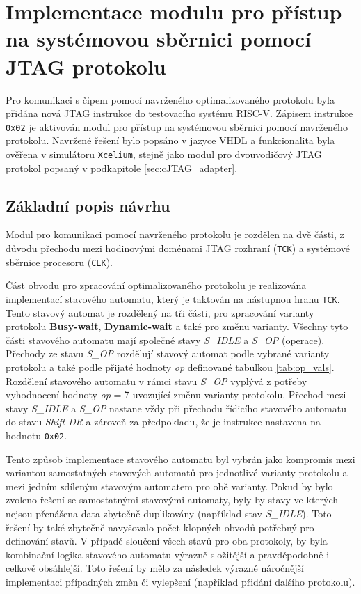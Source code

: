 \section{Implementace modulu pro přístup na systémovou sběrnici pomocí \acs{JTAG} protokolu}
Pro komunikaci s čipem pomocí navrženého optimalizovaného protokolu byla přidána nová \acs{JTAG} instrukce do testovacího systému \acs{RISC-V}. Zápisem instrukce \texttt{0x02} je aktivován modul pro přístup na systémovou sběrnici pomocí navrženého protokolu. Navržené řešení bylo popsáno v jazyce \acs{VHDL} a funkcionalita byla ověřena v simulátoru \texttt{Xcelium}, stejně jako modul pro dvouvodičový \acs{JTAG} protokol popsaný v podkapitole \ref{sec:cJTAG_adapter}.

\subsection{Základní popis návrhu}	\label{subsec:jtag_ap_impl}
Modul pro komunikaci pomocí navrženého protokolu je rozdělen na dvě části, z důvodu přechodu mezi hodinovými doménami \acs{JTAG} rozhraní (\texttt{\acs{TCK}}) a systémové sběrnice procesoru (\texttt{CLK}).

Část obvodu pro zpracování optimalizovaného protokolu je realizována implementací stavového automatu, který je taktován na nástupnou hranu \texttt{\acs{TCK}}. Tento stavový automat je rozdělený na tři části, pro zpracování varianty protokolu \textbf{Busy-wait}, \textbf{Dynamic-wait} a také pro změnu varianty. Všechny tyto části stavového automatu mají společné stavy \textit{S\_IDLE} a \textit{S\_OP} (operace). Přechody ze stavu \textit{S\_OP} rozdělují stavový automat podle vybrané varianty protokolu a také podle přijaté hodnoty \textit{op} definované tabulkou \ref{tab:op_vals}. Rozdělení stavového automatu v rámci stavu \textit{S\_OP} vyplývá z potřeby vyhodnocení hodnoty \textit{op} = 7 uvozující změnu varianty protokolu. Přechod mezi stavy \textit{S\_IDLE} a \textit{S\_OP} nastane vždy při přechodu řídicího stavového automatu do stavu \textit{Shift-DR} a zároveň za předpokladu, že je instrukce nastavena na hodnotu \texttt{0x02}.

Tento způsob implementace stavového automatu byl vybrán jako kompromis mezi variantou samostatných stavových automatů pro jednotlivé varianty protokolu a mezi jedním sdíleným stavovým automatem pro obě varianty. Pokud by bylo zvoleno řešení se samostatnými stavovými automaty, byly by stavy ve kterých nejsou přenášena data zbytečně duplikovány (například stav \textit{S\_IDLE}). Toto řešení by také zbytečně navyšovalo počet klopných obvodů potřebný pro definování stavů. V případě sloučení všech stavů pro oba protokoly, by byla kombinační logika stavového automatu výrazně složitější a pravděpodobně i celkově obsáhlejší. Toto řešení by mělo za následek výrazně náročnější implementaci případných změn či vylepšení (například přidání dalšího protokolu). 

